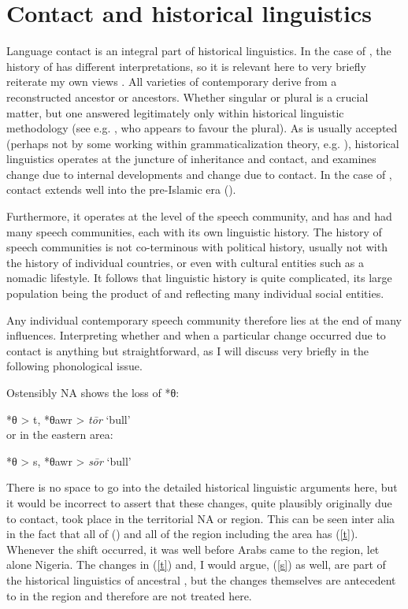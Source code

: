 \documentclass[output=paper]{langsci/langscibook}
\begin{document}
\section{Contact and historical linguistics
}


Language contact is an integral part of historical linguistics. In the case of , the history of  has different interpretations, so it is relevant here to very briefly reiterate my own views \citep{Owens2006}. All varieties of contemporary  derive from a reconstructed ancestor or ancestors. Whether singular or plural is a crucial matter, but one answered legitimately only within historical linguistic methodology (see e.g. \citealt{Retsö2013}, who appears to favour the plural). As is usually accepted (perhaps not by some working within {grammaticalization} theory, e.g. \citealt{HeineKuteva2011}), historical linguistics operates at the juncture of inheritance and contact, and examines change due to internal developments and change due to contact. In the case of , contact extends well into the pre-Islamic era (\citealt{Owens2013,Owens2016Aramaic,Owensforthcoming}).

Furthermore, it operates at the level of the {speech community}, and  has and had many speech communities, each with its own linguistic history. The history of speech communities is not co-terminous with political history, usually not with the history of individual countries, or even with cultural entities such as a nomadic lifestyle. It follows that  linguistic history is quite complicated, its large population being the product of and reflecting many individual social entities.


Any individual contemporary  {speech community} therefore lies at the end of many influences. Interpreting whether and when a particular change occurred due to contact is anything but straightforward, as I will discuss very briefly in the following phonological issue.

Ostensibly NA shows the loss of *θ:

\ea\label{t}
*\textup{θ} > t, \textup{*}θawr > \textit{tōr}  \textup{‘bull’}\\
\z
  or in the eastern area:

\ea\label{s}
  *θ > s, \textup{*}θawr > \textit{sōr} \textup{‘bull’}\\
\z


There is no space to go into the detailed historical linguistic arguments here, but it would be incorrect to assert that these changes, quite plausibly originally due to contact, took place in the territorial NA or  region. This can be seen inter alia in the fact that all of  () and all of the  region including the  area has (\ref{t}). Whenever the shift occurred, it was well before Arabs came to the  region, let alone Nigeria. The changes in (\ref{t}) and, I would argue, (\ref{s}) as well, are part of the historical linguistics of ancestral  , but the changes themselves are antecedent to  in the  region and therefore are not treated here.
\end{document}
